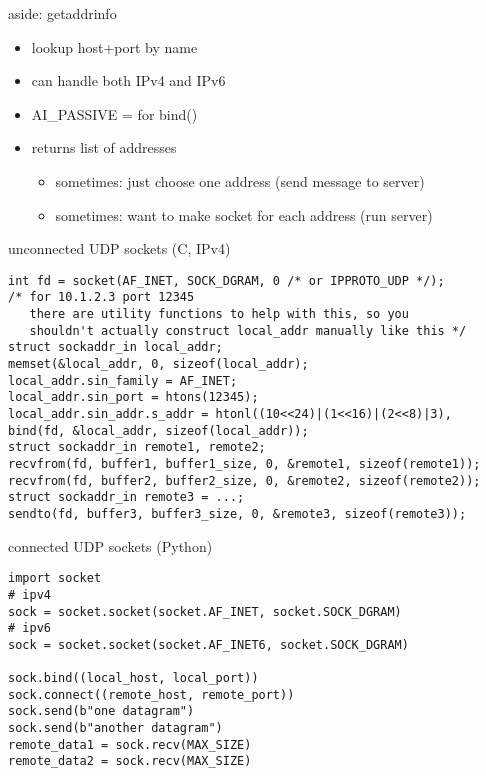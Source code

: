 \begin{frame}{aside: getaddrinfo}
    \begin{itemize}
    \item lookup host+port by name
    \item can handle both IPv4 and IPv6
    \item AI\_PASSIVE = for bind()
    \item returns list of addresses
        \begin{itemize}
        \item sometimes: just choose one address (send message to server)
        \item sometimes: want to make socket for each address (run server)
        \end{itemize}
    \end{itemize}
\end{frame}

\begin{frame}[fragile]{unconnected UDP sockets (C, IPv4)}
\begin{Verbatim}[fontsize=\fontsize{9}{10}\selectfont]
int fd = socket(AF_INET, SOCK_DGRAM, 0 /* or IPPROTO_UDP */);
/* for 10.1.2.3 port 12345 
   there are utility functions to help with this, so you 
   shouldn't actually construct local_addr manually like this */
struct sockaddr_in local_addr;
memset(&local_addr, 0, sizeof(local_addr);
local_addr.sin_family = AF_INET;
local_addr.sin_port = htons(12345);
local_addr.sin_addr.s_addr = htonl((10<<24)|(1<<16)|(2<<8)|3),
bind(fd, &local_addr, sizeof(local_addr));
struct sockaddr_in remote1, remote2;
recvfrom(fd, buffer1, buffer1_size, 0, &remote1, sizeof(remote1));
recvfrom(fd, buffer2, buffer2_size, 0, &remote2, sizeof(remote2));
struct sockaddr_in remote3 = ...;
sendto(fd, buffer3, buffer3_size, 0, &remote3, sizeof(remote3));
\end{Verbatim}
\end{frame}

\begin{frame}[fragile]{connected UDP sockets (Python)}
\begin{Verbatim}[fontsize=\small]
import socket
# ipv4
sock = socket.socket(socket.AF_INET, socket.SOCK_DGRAM)
# ipv6
sock = socket.socket(socket.AF_INET6, socket.SOCK_DGRAM)

sock.bind((local_host, local_port))
sock.connect((remote_host, remote_port))
sock.send(b"one datagram")
sock.send(b"another datagram")
remote_data1 = sock.recv(MAX_SIZE)
remote_data2 = sock.recv(MAX_SIZE)
\end{Verbatim}
\end{frame}

